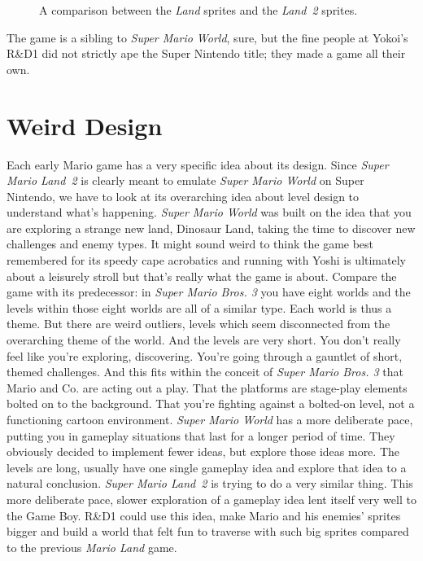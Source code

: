 \documentclass{book}
\begin{document}
\FloatBarrier\vspace{\baselineskip}\begin{figure}[H]\caption*{A comparison between the \emph{Land} sprites and the \emph{Land~2} sprites.}\end{figure}
The game is a sibling to \emph{Super Mario World}, sure, but the fine people at Yokoi’s R\&D1 did not strictly ape the Super Nintendo title; they made a game all their own.\par
\FloatBarrier\section*{Weird Design}
Each early Mario game has a very specific idea about its design. Since \emph{Super Mario Land~2} is clearly meant to emulate \emph{Super Mario World} on Super Nintendo, we have to look at its overarching idea about level design to understand what’s happening. \emph{Super Mario World} was built on the idea that you are exploring a strange new land, Dinosaur Land, taking the time to discover new challenges and enemy types. It might sound weird to think the game best remembered for its speedy cape acrobatics and running with Yoshi is ultimately about a leisurely stroll but that’s really what the game is about. Compare the game with its predecessor: in \emph{Super Mario Bros. 3} you have eight worlds and the levels within those eight worlds are all of a similar type. Each world is thus a theme. But there are weird outliers, levels which seem disconnected from the overarching theme of the world. And the levels are very short. You don’t really feel like you’re exploring, discovering. You’re going through a gauntlet of short, themed challenges. And this fits within the conceit of \emph{Super Mario Bros. 3} that Mario and Co. are acting out a play. That the platforms are stage-play elements bolted on to the background. That you’re fighting against a bolted-on level, not a functioning cartoon environment. \emph{Super Mario World} has a more deliberate pace, putting you in gameplay situations that last for a longer period of time. They obviously decided to implement fewer ideas, but explore those ideas more. The levels are long, usually have one single gameplay idea and explore that idea to a natural conclusion. \emph{Super Mario Land~2} is trying to do a very similar thing. This more deliberate pace, slower exploration of a gameplay idea lent itself very well to the Game Boy. R\&D1 could use this idea, make Mario and his enemies’ sprites bigger and build a world that felt fun to traverse with such big sprites compared to the previous \emph{Mario Land} game.\par
\end{document}
